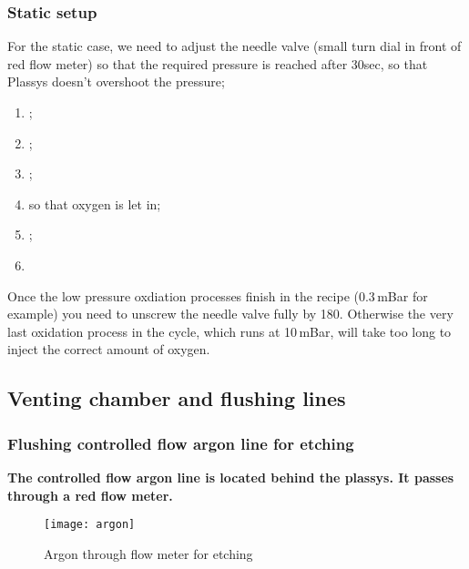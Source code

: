   \subsubsection{Static setup}
  For the static case, we need to adjust the needle valve (small turn
  dial in front  of red flow meter) so that  the required pressure is
  reached  after  30sec,  so   that  Plassys  doesn't  overshoot  the
  pressure;
  \begin{enumerate}
  \item {};
  \item {};
  \item {};
  \item {} so that oxygen is let in;
  \item  {};
  \item  {}
  \end{enumerate}
  {\LARGE Once  the low  pressure oxdiation  processes finish  in the
    recipe (0.3\,mBar  for example)  you need  to unscrew  the needle
    valve  fully  by 180\ideg.   Otherwise  the  very last  oxidation
    process in the cycle, which runs  at 10\,mBar, will take too long
    to inject the correct amount of oxygen.  }

  \subsection{Venting chamber and flushing lines}

  \subsubsection{Flushing controlled flow argon line for etching}
  \begin{framed}\noindent
    \textbf{The  controlled flow  argon  line is  located behind  the
      plassys.  It  passes through a  red flow meter.   }
  \end{framed}

 \begin{figure}[h]
   \centering \texttt{[image: argon]}
   \caption{\small     Argon      through     flow      meter     for
     etching\label{fig:argon}}
 \end{figure}


